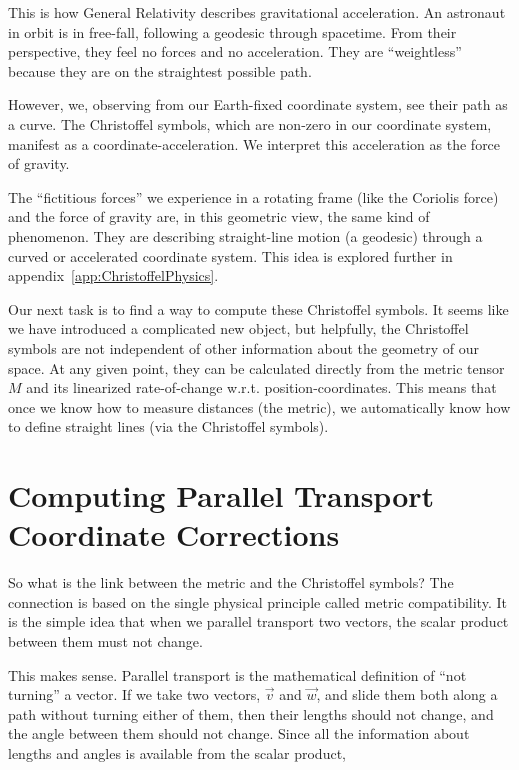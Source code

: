 \documentclass[twocolumn]{article}
\begin{document}
This is how General Relativity describes gravitational
acceleration. An astronaut in orbit is in free-fall, following a
geodesic through spacetime. From their perspective, they feel no
forces and no acceleration. They are ``weightless'' because they are
on the straightest possible path.

However, we, observing from our Earth-fixed coordinate system, see
their path as a curve. The Christoffel symbols, which are non-zero in
our coordinate system, manifest as a coordinate-acceleration. We
interpret this acceleration as the force of gravity.

The ``fictitious forces'' we experience in a rotating frame (like the
Coriolis force) and the force of gravity are, in this geometric view,
the same kind of phenomenon. They are describing straight-line motion
(a geodesic) through a curved or accelerated coordinate system. This
idea is explored further in appendix~\ref{app:ChristoffelPhysics}.

Our next task is to find a way to compute these Christoffel
symbols. It seems like we have introduced a complicated new object,
but helpfully, the Christoffel symbols are not independent of other
information about the geometry of our space. At any given point, they
can be calculated directly from the metric tensor \(M\) and its
linearized rate-of-change w.r.t. position-coordinates. This means that
once we know how to measure distances (the metric), we automatically
know how to define straight lines (via the Christoffel symbols).


\section{Computing Parallel Transport Coordinate Corrections}\label{sec:computingChristoffel}

So what is the link between the metric and the Christoffel symbols? The
connection is based on the single physical principle called metric
compatibility. It is the simple idea that when we parallel transport two
vectors, the scalar product between them must not change.

This makes sense. Parallel transport is the mathematical definition of
``not turning'' a vector. If we take two vectors, \(\vec{v}\) and
\(\vec{w}\), and slide them both along a path without turning either of
them, then their lengths should not change, and the angle between them
should not change. Since all the information about lengths and angles
is available from the scalar product,
\end{document}
